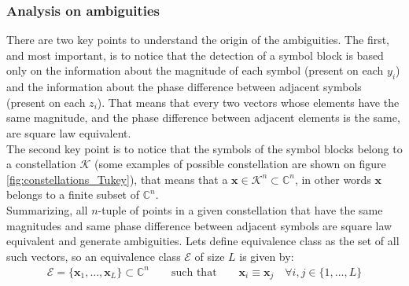 \subsubsection{Analysis on ambiguities}

There are two key points to understand the origin of the ambiguities. The first, and most important, is to notice that the detection of a symbol block is based only on the information about the magnitude of each symbol (present on each $y_i$) and the information about the phase difference between adjacent symbols (present on each $z_i$). That means that every two vectors whose elements have the same magnitude, and the phase difference between adjacent elements is the same, are square law equivalent.\\

The second key point is to notice that the symbols of the symbol blocks belong to a constellation $\mathcal K$ (some examples of possible constellation are shown on figure \ref{fig:constellations_Tukey}), that means that a $\bm x\in \mathcal K^n \subset\mathds{C}^n$, in other words $\bm x$ belongs to a finite subset of $\mathds{C}^n$.\\

Summarizing, all $n$-tuple of points in a given constellation that have the same magnitudes and same phase difference between adjacent symbols are square law equivalent and generate ambiguities. Lets define equivalence class as the set of all such vectors, so an equivalence class $\mathcal{E}$ of size $L$ is given by:
\begin{align}
	\mathcal E=\{\bm x_1, \dotsc,\bm x_L\} \subset\mathds C^n\qquad \text{such that}\qquad\bm x_i\equiv\bm x_j\quad \forall i,j \in \{1,\dotsc,L\} 
\end{align}


